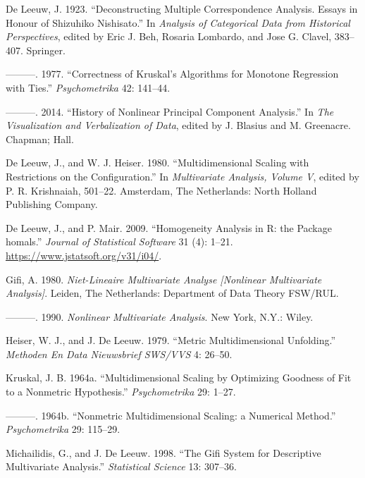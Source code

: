 \documentclass[
  12pt,
]{article}
\newlength{\cslhangindent}
\newenvironment{CSLReferences}[2] %
 {\begin{list}{}{%
  \setlength{\itemindent}{0pt}
  \setlength{\leftmargin}{0pt}
  \setlength{\parsep}{0pt}
  \ifodd #1
   \setlength{\leftmargin}{\cslhangindent}
   \setlength{\itemindent}{-1\cslhangindent}
  \fi
  \setlength{\itemsep}{#2\baselineskip}}}
 {\end{list}}
\begin{document}
\label{refs}
\begin{CSLReferences}{1}{0}
De Leeuw, J. 1923. {``Deconstructing Multiple Correspondence Analysis. Essays in Honour of Shizuhiko Nishisato.''} In \emph{Analysis of Categorical Data from Historical Perspectives}, edited by Eric J. Beh, Rosaria Lombardo, and Jose G. Clavel, 383--407. Springer.

---------. 1977. {``Correctness of Kruskal's Algorithms for Monotone Regression with Ties.''} \emph{Psychometrika} 42: 141--44.

---------. 2014. {``{History of Nonlinear Principal Component Analysis}.''} In \emph{{The Visualization and Verbalization of Data}}, edited by J. Blasius and M. Greenacre. Chapman; Hall.

De Leeuw, J., and W. J. Heiser. 1980. {``Multidimensional Scaling with Restrictions on the Configuration.''} In \emph{Multivariate Analysis, Volume {V}}, edited by P. R. Krishnaiah, 501--22. Amsterdam, The Netherlands: North Holland Publishing Company.

De Leeuw, J., and P. Mair. 2009. {``{Homogeneity Analysis in {R}: the Package homals}.''} \emph{Journal of Statistical Software} 31 (4): 1--21. \url{https://www.jstatsoft.org/v31/i04/}.

Gifi, A. 1980. \emph{Niet-Lineaire Multivariate Analyse {[}Nonlinear Multivariate Analysis{]}}. Leiden, The Netherlands: Department of Data Theory FSW/RUL.

---------. 1990. \emph{Nonlinear Multivariate Analysis}. New York, N.Y.: Wiley.

Heiser, W. J., and J. De Leeuw. 1979. {``Metric Multidimensional Unfolding.''} \emph{Methoden En Data Nieuwsbrief SWS/VVS} 4: 26--50.

Kruskal, J. B. 1964a. {``{Multidimensional Scaling by Optimizing Goodness of Fit to a Nonmetric Hypothesis}.''} \emph{Psychometrika} 29: 1--27.

---------. 1964b. {``{Nonmetric Multidimensional Scaling: a Numerical Method}.''} \emph{Psychometrika} 29: 115--29.

Michailidis, G., and J. De Leeuw. 1998. {``The Gifi System for Descriptive Multivariate Analysis.''} \emph{Statistical Science} 13: 307--36.

\end{CSLReferences}
\end{document}
